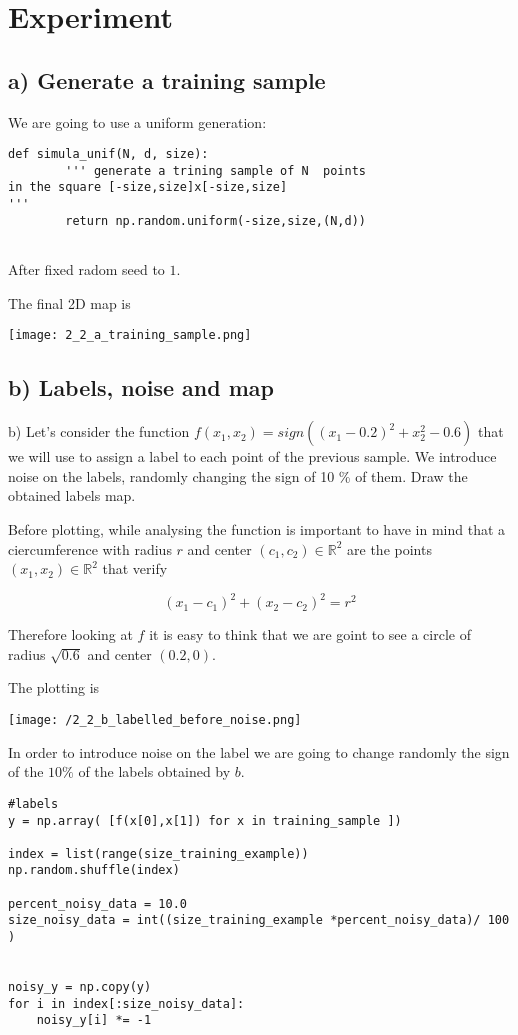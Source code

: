 \section{Experiment }

\subsection{a) Generate a training sample}

We are going to use a uniform generation:

\begin{verbatim}
def simula_unif(N, d, size):
        ''' generate a trining sample of N  points
in the square [-size,size]x[-size,size]
'''
        return np.random.uniform(-size,size,(N,d))
 
\end{verbatim}

After fixed radom seed to $1$.

The final 2D map  is

\texttt{[image: 2\_2\_a\_training\_sample.png]}

\subsection{b) Labels, noise and map}

b) Let's consider the function $f(x_1, x_2) = sign((x_1 - 0.2)^2 + x_2^2 - 0.6)$ that we will use to assign a label to each point of the previous sample. We introduce noise on the labels, randomly changing the sign of 10 \% of them.
Draw the obtained labels map.


Before plotting, while analysing the function is important to have in mind that a ciercumference with radius $r$ and center $(c_1, c_2) \in \mathbb R^2$ are the points $(x_1, x_2) \in \mathbb R^2$ that verify 

\[ (x_1 - c_1)^2 + (x_2 - c_2)^2 = r^2\]

Therefore looking at $f$ it is easy to think that we are goint to see a circle of radius $\sqrt{0.6}$ and center $(0.2, 0)$.

The plotting is

\texttt{[image: /2\_2\_b\_labelled\_before\_noise.png]}

In order to introduce noise on the label we are going to change randomly the sign of the $10\%$ of  the labels obtained by $b$.



\begin{verbatim}
#labels 
y = np.array( [f(x[0],x[1]) for x in training_sample ])

index = list(range(size_training_example))
np.random.shuffle(index)

percent_noisy_data = 10.0
size_noisy_data = int((size_training_example *percent_noisy_data)/ 100 )


noisy_y = np.copy(y)
for i in index[:size_noisy_data]:
    noisy_y[i] *= -1

  \end{verbatim}

